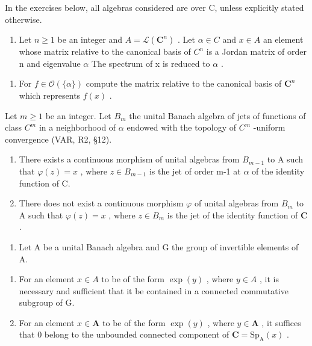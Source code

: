 
In the exercises below, all algebras considered are over C, unless explicitly stated otherwise.

\begin{enumerate}
\def\labelenumi{\arabic{enumi})}
\tightlist
\item
  Let \(n \geqslant 1\) be an integer and \(A = \mathcal{L}(\mathbf{C}^{n})\) . Let \(\alpha \in C\) and \(x \in A\) an element whose matrix relative to the canonical basis of \(C^{n}\) is a Jordan matrix of order n and eigenvalue \(\alpha\) The spectrum of x is reduced to \(\alpha\) .
\end{enumerate}

\begin{enumerate}
\def\labelenumi{\alph{enumi})}
\tightlist
\item
  For \(f \in \mathcal{O}(\{\alpha\})\) compute the matrix relative to the canonical basis of \(\mathbf{C}^n\) which represents \(f(x)\) .
\end{enumerate}

Let \(m \geqslant 1\) be an integer. Let \(B_{m}\) the unital Banach algebra of jets of functions of class \(C^{m}\) in a neighborhood of \(\alpha\) endowed with the topology of \(C^{m}\) -uniform convergence (VAR, R2, §12).

\begin{enumerate}
\def\labelenumi{\alph{enumi})}
\setcounter{enumi}{1}
\item
  There exists a continuous morphism of unital algebras from \(B_{m-1}\) to A such that \(\varphi(z)=x\) , where \(z\in B_{m-1}\) is the jet of order m-1 at \(\alpha\) of the identity function of C.
\item
  There does not exist a continuous morphism \(\varphi\) of unital algebras from \(B_m\) to A such that \(\varphi(z) = x\) , where \(z \in B_m\) is the jet of the identity function of \(\mathbf{C}\) .
\end{enumerate}

\begin{enumerate}
\def\labelenumi{\arabic{enumi})}
\setcounter{enumi}{1}
\tightlist
\item
  Let A be a unital Banach algebra and G the group of invertible elements of A.
\end{enumerate}

\begin{enumerate}
\def\labelenumi{\alph{enumi})}
\item
  For an element \(x \in A\) to be of the form \(\exp(y)\) , where \(y \in A\) , it is necessary and sufficient that it be contained in a connected commutative subgroup of G.
\item
  For an element \(x \in \mathbf{A}\) to be of the form \(\exp(y)\) , where \(y \in \mathbf{A}\) , it suffices that 0 belong to the unbounded connected component of \(\mathbf{C} = \mathrm{Sp}_{\mathrm{A}}(x)\) .
\end{enumerate}

